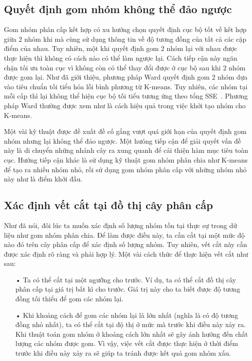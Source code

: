 \subsection{Quyết định gom nhóm không thể đảo ngược}
Gom nhóm phân cấp kết hợp có xu hướng chọn quyết định cục bộ tốt về kết hợp giữa 2 nhóm khi mà cùng sử dụng thông tin về độ tương đồng của tất cả các cặp điểm của nhau.
Tuy nhiên, một khi quyết định gom 2 nhóm lại với nhau được thực hiện thì không có cách nào có thể làm ngược lại.
Cách tiếp cận này ngăn chặn tối ưu toàn cục vì không còn có thể thay đổi được ở cục bộ sau khi 2 nhóm được gom lại.
Như đã giới thiệu, phương pháp Ward quyết định gom 2 nhóm dựa vào tiêu chuẩn tối tiểu hóa lỗi bình phương từ K-means.
Tuy nhiên, các nhóm tại mỗi cấp thì lại không thể hiện cục bộ tối tiểu tương ứng theo tổng SSE~\cite{SSE}.
Phương pháp Ward thường được xem như là cách hiệu quả trong việc khởi tạo nhóm cho K-means.

Một vài kỹ thuật được đề xuất đề cố gắng vượt quá giới hạn của quyết định gom nhóm nhưng lại không thể đảo ngược.
Một hưóng tiếp cận để giải quyết vấn đề này là di chuyển những nhánh cây ra xung quanh để cải thiện hàm mục tiêu toàn cục.
Hướng tiếp cận khác là sử dụng kỹ thuật gom nhóm phân chia như K-means để tạo ra nhiều nhóm nhỏ, rồi sử dụng gom nhóm phân cấp với những nhóm nhỏ này như là điểm khởi đầu.

\subsection{Xác định vết cắt tại đồ thị cây phân cấp}
Như đã nói, đôi lúc ta muốn xác định số lượng nhóm tồn tại thực sự trong dữ liệu như gom nhóm phân chia.
Để làm được điều này, ta cần cắt tại một mức độ nào đó trên cây phân cấp để xác định số lượng nhóm.
Tuy nhiên, vết cắt này cần được xác định rõ ràng và phải hợp lý.
Một vài cách thức để thực hiện vết cắt như sau:
\begin{enumerate}
\item[•]Ta có thể cắt tại một ngưỡng cho trước.
Ví dụ, ta có thể cắt đồ thị cây phân cấp tại giá trị bất kì cho trước.
Giá trị này cho ta biết được độ tương đồng tối thiểu để gom các nhóm lại.
\item[•]Khi khoảng cách để gom các nhóm lại là lớn nhất (nghĩa là có độ tương đồng nhỏ nhất), ta có thể cắt tại độ thị ở mức mà trước khi điều này xảy ra.
Khi thuật toán gom nhóm ở khoảng cách lớn nhất sẽ gây ảnh hưởng đến chất lượng các nhóm được gom.
Vì vậy, việc vết cắt được thực hiện ở thời điểm trước khi điều này xảy ra sẽ giúp ta tránh được kết quả gom nhóm xấu.
\end{enumerate}

